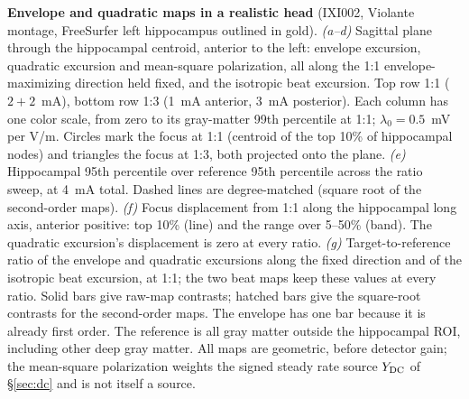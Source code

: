 \documentclass[11pt,a4paper]{article}
\providecommand{\DIFdeltex}[1]{{\protect\color{red} \scriptsize #1}} %
\providecommand{\DIFdelbegin}{} %
\providecommand{\DIFdelFL}[1]{\DIFdel{#1}} %
\providecommand{\DIFdel}[1]{\texorpdfstring{\DIFdeltex{#1}}{}} %
\begin{document}
\DIFdelbegin %
{%
\DIFdelFL{\textbf{Envelope and quadratic maps in a realistic head} (IXI002, Violante
montage, FreeSurfer left hippocampus outlined in gold). \emph{(a--d)} Sagittal plane
through the hippocampal centroid, anterior to the left: envelope excursion, quadratic
excursion and mean-square polarization, all along the 1:1 envelope-maximizing direction
held fixed, and the isotropic beat excursion. Top row 1:1 ($2+2$~mA), bottom row 1:3
(1~mA anterior, 3~mA posterior). Each column has one color scale, from zero to its
gray-matter 99th percentile at 1:1; $\lambda_0=0.5$~mV per V/m. Circles mark the focus
at 1:1 (centroid of the top 10\% of hippocampal nodes) and triangles the focus at 1:3,
both projected onto the plane. \emph{(e)} Hippocampal 95th percentile over reference
95th percentile across the ratio sweep, at 4~mA total. Dashed lines are degree-matched
(square root of the second-order maps). \emph{(f)} Focus displacement from 1:1 along
the hippocampal long axis, anterior positive: top 10\% (line) and the range over
5--50\% (band). The quadratic excursion's displacement is zero at every ratio.
\emph{(g)} Target-to-reference ratio of the envelope and quadratic excursions along the
fixed direction and of the isotropic beat excursion, at 1:1; the two beat maps keep
these values at every ratio. Solid bars give raw-map contrasts; hatched bars give
the square-root contrasts for the second-order maps. The envelope has one bar
because it is already first order. The reference is all gray matter outside the
hippocampal ROI, including other deep gray matter.
All maps are geometric, before detector gain; the mean-square polarization
weights the signed steady rate source $Y_{\rm DC}$ of \S\ref{sec:dc}
and is not itself a source.}}

\end{document}
